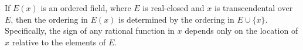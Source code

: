 If $E(x)$ is an ordered field, where $E$ is real-closed and $x$ is transcendental over $E$, then the ordering in $E(x)$ is determined by the ordering in $E \cup \{x\}$. Specifically, the sign of any rational function in $x$ depends only on the location of $x$ relative to the elements of $E$.